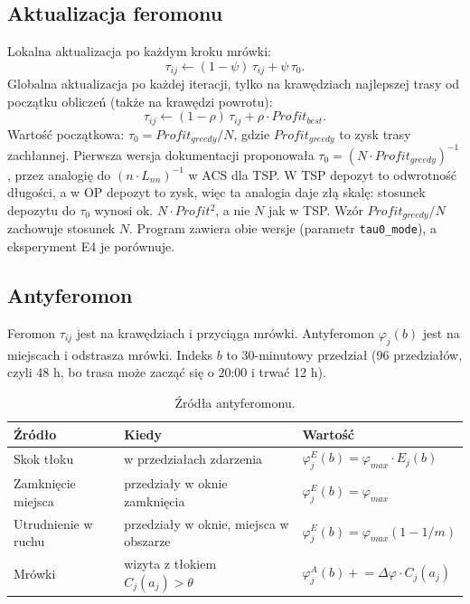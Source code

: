 \documentclass[11pt,a4paper]{article}
\begin{document}
\subsection{Aktualizacja feromonu}

Lokalna aktualizacja po każdym kroku mrówki:
\begin{equation}
\tau_{ij} \leftarrow (1 - \psi)\,\tau_{ij} + \psi\,\tau_0.
\end{equation}
Globalna aktualizacja po każdej iteracji, tylko na krawędziach najlepszej trasy od początku obliczeń (także na krawędzi powrotu):
\begin{equation}
\tau_{ij} \leftarrow (1 - \rho)\,\tau_{ij} + \rho \cdot Profit_{best}.
\end{equation}
Wartość początkowa: $\tau_0 = Profit_{greedy} / N$, gdzie $Profit_{greedy}$ to zysk trasy zachłannej. Pierwsza wersja dokumentacji proponowała $\tau_0 = (N \cdot Profit_{greedy})^{-1}$, przez analogię do $(n \cdot L_{nn})^{-1}$ w ACS dla TSP. W TSP depozyt to odwrotność długości, a w OP depozyt to zysk, więc ta analogia daje złą skalę: stosunek depozytu do $\tau_0$ wynosi ok. $N \cdot Profit^2$, a nie $N$ jak w TSP. Wzór $Profit_{greedy}/N$ zachowuje stosunek $N$. Program zawiera obie wersje (parametr \texttt{tau0\_mode}), a eksperyment E4 je porównuje.

\subsection{Antyferomon}

Feromon $\tau_{ij}$ jest na krawędziach i przyciąga mrówki. Antyferomon $\varphi_j(b)$ jest na miejscach i odstrasza mrówki. Indeks $b$ to 30-minutowy przedział (96 przedziałów, czyli 48 h, bo trasa może zacząć się o 20:00 i trwać 12 h).

\begin{table}[h]
\centering
\caption{Źródła antyferomonu.}
\begin{tabular}{lll}
\toprule
Źródło & Kiedy & Wartość \\
\midrule
Skok tłoku & w przedziałach zdarzenia & $\varphi_j^E(b) = \varphi_{max} \cdot E_j(b)$ \\
Zamknięcie miejsca & przedziały w oknie zamknięcia & $\varphi_j^E(b) = \varphi_{max}$ \\
Utrudnienie w ruchu & przedziały w oknie, miejsca w obszarze & $\varphi_j^E(b) = \varphi_{max}(1 - 1/m)$ \\
Mrówki & wizyta z tłokiem $C_j(a_j) > \theta$ & $\varphi_j^A(b) \mathrel{+}= \Delta\varphi \cdot C_j(a_j)$ \\
\bottomrule
\end{tabular}
\end{table}
\end{document}
